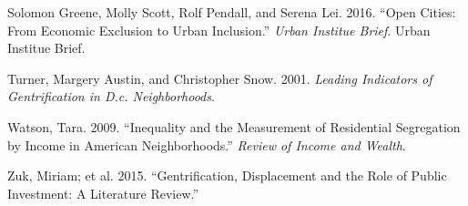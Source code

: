 \documentclass[12pt,]{article}
\begin{document}
\leavevmode\hypertarget{ref-urban2016}{}%
Solomon Greene, Molly Scott, Rolf Pendall, and Serena Lei. 2016. ``Open
Cities: From Economic Exclusion to Urban Inclusion.'' \emph{Urban
Institue Brief}. Urban Institue Brief.

\leavevmode\hypertarget{ref-Turner2001}{}%
Turner, Margery Austin, and Christopher Snow. 2001. \emph{Leading
Indicators of Gentrification in D.c. Neighborhoods}.

\leavevmode\hypertarget{ref-Watson2009}{}%
Watson, Tara. 2009. ``Inequality and the Measurement of Residential
Segregation by Income in American Neighborhoods.'' \emph{Review of
Income and Wealth}.

\leavevmode\hypertarget{ref-Zuk2015}{}%
Zuk, Miriam; et al. 2015. ``Gentrification, Displacement and the Role of
Public Investment: A Literature Review.''
\end{document}
